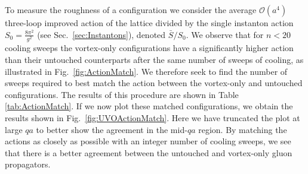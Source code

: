 To measure the roughness of a configuration we consider the average $\mathcal{O}(a^4)$ three-loop improved action of the lattice divided by the single instanton action $S_0=\frac{8\pi^2}{g^2}$ (see Sec.~\ref{sec:Instantons}), denoted $\bar{S}/S_0$. We observe that for $n<20$ cooling sweeps the vortex-only configurations have a significantly higher action than their untouched counterparts after the same number of sweeps of cooling, as illustrated in Fig.~\ref{fig:ActionMatch}. We therefore seek to find the number of sweeps required to best match the action between the vortex-only and untouched configurations. The results of this procedure are shown in Table \ref{tab:ActionMatch}. If we now plot these matched configurations, we obtain the results shown in Fig.~\ref{fig:UVOActionMatch}. Here we have truncated the plot at large $qa$ to better show the agreement in the mid-$qa$ region. By matching the actions as closely as possible with an integer number of cooling sweeps, we see that there is a better agreement between the untouched and vortex-only gluon propagators.\\

